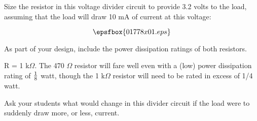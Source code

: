 

Size the resistor in this voltage divider circuit to provide 3.2 volts to the load, assuming that the load will draw 10 mA of current at this voltage:

$$\epsfbox{01778x01.eps}$$

As part of your design, include the power dissipation ratings of both resistors.







R = 1 k$\Omega$.  The 470 $\Omega$ resistor will fare well even with a (low) power dissipation rating of ${1 \over 8}$ watt, though the 1 k$\Omega$ resistor will need to be rated in excess of 1/4 watt.







Ask your students what would change in this divider circuit if the load were to suddenly draw more, or less, current.




